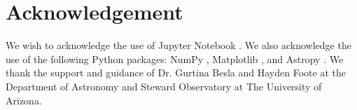 \documentclass[twocolumn]{aastex631}
\begin{document}
\section{Acknowledgement}
\label{sec:acknow}
We wish to acknowledge the use of Jupyter Notebook \citep{Perez_et_al_ipython_2007}. We also acknowledge the use of the following Python packages: NumPy \citep{van_der_Walt_et_al_np_2011}, Matplotlib \citep{Hunter_mpl_2007}, and Astropy \citep{astropy_1, Price_Whelan_et_al_astropy_2018}. We thank the support and guidance of Dr. Gurtina Besla and Hayden Foote at the Department of Astronomy and Steward Observatory at The University of Arizona.


{}

\end{document}
